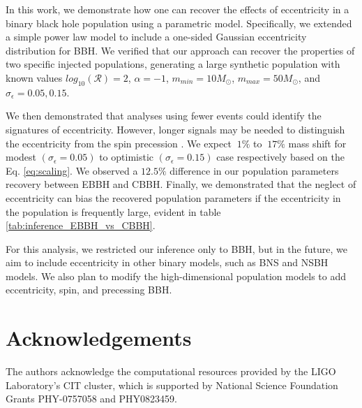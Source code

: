 \documentclass[twocolumn,prd,nofootinbib]{revtex4}
\newcommand\AddedResponse[1]{{\color{blue} {#1}}}
\begin{document}
In this work, we demonstrate how one can recover the effects of eccentricity in a binary black hole population using a
parametric model. Specifically, we extended a simple power law model to include a one-sided Gaussian eccentricity
distribution for BBH. 
We verified that our approach can recover the properties of two specific injected populations,  generating a large synthetic population 
with known values $log_{10}(\mathcal{R}) = 2$, $\alpha=-1$, $m_{min} = 10 M_\odot$, $m_{max} = 50 M_\odot$, and 
$\sigma_\epsilon = {0.05, 0.15}$. 

We then demonstrated that analyses using fewer events could identify the signatures of eccentricity. \AddedResponse{ However, longer signals may be needed to distinguish the eccentricity from the spin precession \cite{2023MNRAS.519.5352R}.}
%
We expect $~1\%$ to $~17\%$ mass shift for modest $(\sigma_\epsilon = 0.05)$ 
to optimistic $(\sigma_\epsilon = 0.15)$ case respectively based on the Eq. \ref{eq:scaling}.
We observed a $12.5\%$ difference in our population parameters recovery between EBBH and CBBH.
Finally, we demonstrated that the neglect of eccentricity can bias the recovered population parameters if the
eccentricity in the population is frequently large, evident in table \ref{tab:inference_EBBH_vs_CBBH}.

For this analysis, we restricted our inference only to BBH, but in the future, we aim to include eccentricity 
in other binary models, such as BNS and NSBH models. We also plan to modify the high-dimensional population 
models \cite{Dan_2019} to add eccentricity, spin, and precessing BBH.

\section*{Acknowledgements}

The authors acknowledge the computational resources provided by the LIGO Laboratory’s CIT 
cluster, which is supported by National Science Foundation Grants PHY-0757058 and PHY0823459.




\end{document}
